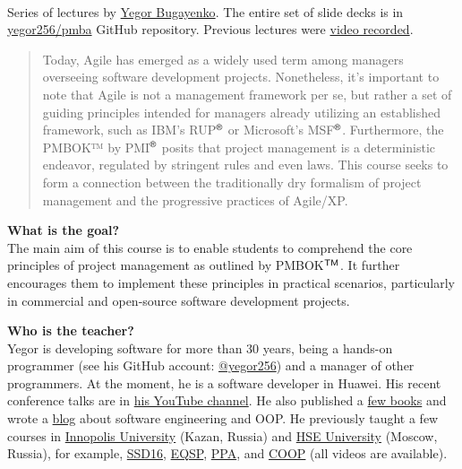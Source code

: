 \documentclass[nobrand,anonymous,nodate,nosecurity]{huawei}
\newcommand\REG{$^{\tiny{\textsf{\textregistered}}}$}
\newcommand\TM{$^{\tiny{\textsf{TM}}}$}
\begin{document}
{\\
Series of lectures by \href{https://www.yegor256.com}{Yegor Bugayenko}.
The entire set of slide decks is in \href{https://github.com/yegor256/pmba}{yegor256/pmba} GitHub repository.
Previous lectures were \href{https://www.youtube.com/playlist?list=PLaIsQH4uc08x_T-Aelduv3Zf0DWRx40pq}{video recorded}.

\begin{abstract}
Today, Agile has emerged as a widely used term among managers overseeing software development projects. Nonetheless, it's important to note that Agile is not a management framework per se, but rather a set of guiding principles intended for managers already utilizing an established framework, such as IBM's RUP\REG{} or Microsoft's MSF\REG{}. Furthermore, the PMBOK™ by PMI\REG{} posits that project management is a deterministic endeavor, regulated by stringent rules and even laws. This course seeks to form a connection between the traditionally dry formalism of project management and the progressive practices of Agile/XP.
\end{abstract}

\textbf{What is the goal?}\\
The main aim of this course is to enable students to comprehend the core principles of project management as outlined by PMBOK\TM{}. It further encourages them to implement these principles in practical scenarios, particularly in commercial and open-source software development projects.

\textbf{Who is the teacher?}\\
Yegor is developing software for more than 30 years,
  being a hands-on programmer (see his GitHub account: \href{https://github.com/yegor256}{@yegor256})
  and a manager of other programmers.
At the moment, he is a software developer in Huawei.
His recent conference talks are in \href{https://www.youtube.com/channel/UCr9qCdqXLm2SU0BIs6d_68Q}{his YouTube channel}.
He also published a \href{https://www.yegor256.com/books.html}{few books}
  and wrote a \href{https://www.yegor256.com/contents.html}{blog} about software engineering
  and OOP.
He previously taught a few courses in
  \href{https://innopolis.university/}{Innopolis University} (Kazan, Russia)
  and
  \href{https://hse.ru}{HSE University} (Moscow, Russia),
  for example,
  \href{https://github.com/yegor256/ssd16}{SSD16},
  \href{https://github.com/yegor256/eqsp}{EQSP},
  \href{https://github.com/yegor256/ppa}{PPA},
  and
  \href{https://github.com/yegor256/painofoop}{COOP}
  (all videos are available).

}
\end{document}
